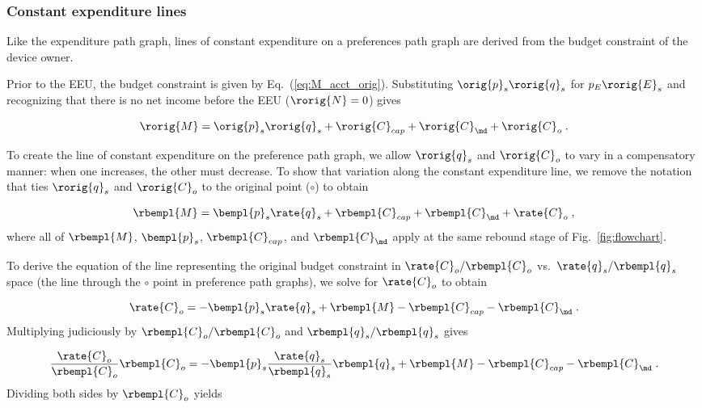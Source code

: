 \subsubsection{Constant expenditure lines} 
\label{sec:pref_graph_constant_expenditure_lines}

Like the expenditure path graph, 
lines of constant expenditure on a preferences path graph 
are derived from the budget constraint of the device owner.

Prior to the EEU, the budget constraint is given by Eq.~(\ref{eq:M_acct_orig}).
Substituting $\orig{p}_s \rorig{q}_s$ for $p_E \rorig{E}_s$ and 
recognizing that there is no net income before the EEU
($\rorig{N} = 0$) gives

\begin{equation}
  \rorig{M} = \orig{p}_s \rorig{q}_s + \rorig{C}_{cap} + \rorig{C}_{\md} + \rorig{C}_o \; .
\end{equation}

To create the line of constant expenditure on the preference path graph, 
we allow $\rorig{q}_s$ and $\rorig{C}_o$ to vary in a compensatory manner:
when one increases, the other must decrease.  
To show that variation along the constant expenditure line, 
we remove the notation that ties $\rorig{q}_s$ and $\rorig{C}_o$
to the original point ($\circ$) to obtain

\begin{equation}
  \rbempl{M} = \bempl{p}_s \rate{q}_s + \rbempl{C}_{cap} + \rbempl{C}_{\md} + \rate{C}_o \; , 
\end{equation}
%
where all of $\rbempl{M}$, $\bempl{p}_s$, $\rbempl{C}_{cap}$, and $\rbempl{C}_{\md}$
apply at the same rebound stage of Fig.~\ref{fig:flowchart}.

To derive the equation of the line representing the original budget constraint 
in $\rate{C}_o/\rbempl{C}_o$ vs.\ $\rate{q}_s/\rbempl{q}_s$ space
(the \circcirc{} line through the $\circ$ point
in preference path graphs), 
we solve for $\rate{C}_o$ to obtain

\begin{equation}
  \rate{C}_o = - \bempl{p}_s \rate{q}_s + \rbempl{M} - \rbempl{C}_{cap} - \rbempl{C}_{\md} \; .
\end{equation}
%
Multiplying judiciously by $\rbempl{C}_o/\rbempl{C}_o$ and $\rbempl{q}_s/\rbempl{q}_s$ gives

\begin{equation}
  \frac{\rate{C}_o}{\rbempl{C}_o} \rbempl{C}_o
       = - \bempl{p}_s \frac{\rate{q}_s}{\rbempl{q}_s} \rbempl{q}_s 
         + \rbempl{M} - \rbempl{C}_{cap} - \rbempl{C}_{\md} \; .
\end{equation}
%
Dividing both sides by $\rbempl{C}_o$ yields

